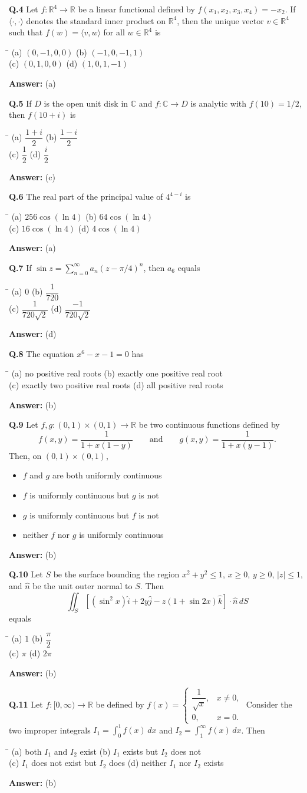 \documentclass[11pt,a4paper]{article}
\newcommand{\optsfour}[4]{%
  \begin{tabbing}
    \hspace{0.48\linewidth}\=\kill
    (a) #1 \> (b) #2 \\[2pt]
    (c) #3 \> (d) #4
  \end{tabbing}%
}
\newcommand{\optslist}[4]{%
  \begin{itemize}
    \setlength{\itemsep}{2pt}\setlength{\parskip}{0pt}
    \item[(a)] #1
    \item[(b)] #2
    \item[(c)] #3
    \item[(d)] #4
  \end{itemize}%
}
\newcommand{\ans}[1]{\textbf{Answer:} #1\par\medskip}
\begin{document}
\textbf{Q.4} Let $f : \mathbb{R}^4 \to \mathbb{R}$ be a linear functional defined by $f(x_1, x_2, x_3, x_4) = -x_2$. If $\langle \cdot, \cdot \rangle$ denotes the standard inner product on $\mathbb{R}^4$, then the unique vector $v \in \mathbb{R}^4$ such that $f(w) = \langle v, w \rangle$ for all $w \in \mathbb{R}^4$ is
\optsfour{$(0, -1, 0, 0)$}{$(-1, 0, -1, 1)$}{$(0, 1, 0, 0)$}{$(1, 0, 1, -1)$}
\ans{(a)}

\textbf{Q.5} If $D$ is the open unit disk in $\mathbb{C}$ and $f : \mathbb{C} \to D$ is analytic with $f(10) = 1/2$, then $f(10 + i)$ is
\optsfour{$\dfrac{1 + i}{2}$}{$\dfrac{1 - i}{2}$}{$\dfrac{1}{2}$}{$\dfrac{i}{2}$}
\ans{(c)}

\textbf{Q.6} The real part of the principal value of $4^{4-i}$ is
\optsfour{$256\cos(\ln 4)$}{$64\cos(\ln 4)$}{$16\cos(\ln 4)$}{$4\cos(\ln 4)$}
\ans{(a)}

\textbf{Q.7} If $\sin z = \displaystyle\sum_{n=0}^{\infty} a_n (z - \pi/4)^n$, then $a_6$ equals
\optsfour{$0$}{$\dfrac{1}{720}$}{$\dfrac{1}{720\sqrt{2}}$}{$\dfrac{-1}{720\sqrt{2}}$}
\ans{(d)}

\textbf{Q.8} The equation $x^6 - x - 1 = 0$ has
\optsfour{no positive real roots}{exactly one positive real root}{exactly two positive real roots}{all positive real roots}
\ans{(b)}

\textbf{Q.9} Let $f, g : (0,1) \times (0,1) \to \mathbb{R}$ be two continuous functions defined by
\[
  f(x,y) = \frac{1}{1 + x(1 - y)} \qquad \text{and} \qquad g(x,y) = \frac{1}{1 + x(y - 1)}.
\]
Then, on $(0,1) \times (0,1)$,
\optslist{$f$ and $g$ are both uniformly continuous}{$f$ is uniformly continuous but $g$ is not}{$g$ is uniformly continuous but $f$ is not}{neither $f$ nor $g$ is uniformly continuous}
\ans{(b)}

\textbf{Q.10} Let $S$ be the surface bounding the region $x^2 + y^2 \le 1$, $x \ge 0$, $y \ge 0$, $|z| \le 1$, and $\hat{n}$ be the unit outer normal to $S$. Then
\[
  \iint_S \left[(\sin^2 x)\hat{i} + 2y\hat{j} - z(1 + \sin 2x)\hat{k}\right] \cdot \hat{n}\,dS
\]
equals
\optsfour{$1$}{$\dfrac{\pi}{2}$}{$\pi$}{$2\pi$}
\ans{(b)}

\textbf{Q.11} Let $f : [0, \infty) \to \mathbb{R}$ be defined by $f(x) = \begin{cases} \dfrac{1}{\sqrt{x}}, & x \ne 0, \\ 0, & x = 0. \end{cases}$ Consider the two improper integrals $I_1 = \displaystyle\int_0^1 f(x)\,dx$ and $I_2 = \displaystyle\int_1^\infty f(x)\,dx$. Then
\optsfour{both $I_1$ and $I_2$ exist}{$I_1$ exists but $I_2$ does not}{$I_1$ does not exist but $I_2$ does}{neither $I_1$ nor $I_2$ exists}
\ans{(b)}
\end{document}
